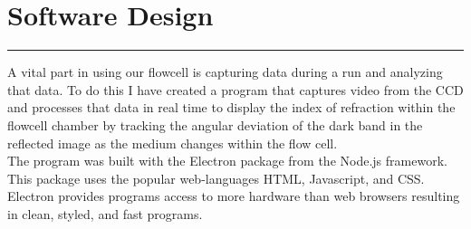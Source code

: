 \documentclass{report}
\begin{document}
\begin{flushleft}
\begin{figure}[h]
	\end{figure}
	
	\section*{Software Design}
	\vspace{-0.1cm}\hrule\vspace{0.2cm}
	A vital part in using our flowcell is capturing data during a run and analyzing that data. To do this I have created a program that captures video from the CCD and processes that data in real time to display the index of refraction within the flowcell chamber by tracking the angular deviation of the dark band in the reflected image as the medium changes within the flow cell.\\
	The program was built with the Electron package from the Node.js framework. This package uses the popular web-languages HTML, Javascript, and CSS. Electron provides programs access to more hardware than web browsers resulting in clean, styled, and fast programs.\\

\end{flushleft}
\end{document}
